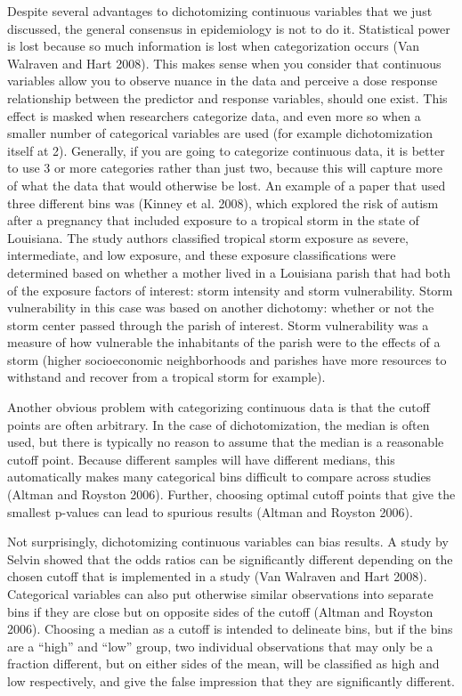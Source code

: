 \documentclass[]{article}
\begin{document}
Despite several advantages to dichotomizing continuous variables that we
just discussed, the general consensus in epidemiology is not to do it.
Statistical power is lost because so much information is lost when
categorization occurs (Van Walraven and Hart 2008). This makes sense
when you consider that continuous variables allow you to observe nuance
in the data and perceive a dose response relationship between the
predictor and response variables, should one exist. This effect is
masked when researchers categorize data, and even more so when a smaller
number of categorical variables are used (for example dichotomization
itself at 2). Generally, if you are going to categorize continuous data,
it is better to use 3 or more categories rather than just two, because
this will capture more of what the data that would otherwise be lost. An
example of a paper that used three different bins was (Kinney et al.
2008), which explored the risk of autism after a pregnancy that included
exposure to a tropical storm in the state of Louisiana. The study
authors classified tropical storm exposure as severe, intermediate, and
low exposure, and these exposure classifications were determined based
on whether a mother lived in a Louisiana parish that had both of the
exposure factors of interest: storm intensity and storm vulnerability.
Storm vulnerability in this case was based on another dichotomy: whether
or not the storm center passed through the parish of interest. Storm
vulnerability was a measure of how vulnerable the inhabitants of the
parish were to the effects of a storm (higher socioeconomic
neighborhoods and parishes have more resources to withstand and recover
from a tropical storm for example).

Another obvious problem with categorizing continuous data is that the
cutoff points are often arbitrary. In the case of dichotomization, the
median is often used, but there is typically no reason to assume that
the median is a reasonable cutoff point. Because different samples will
have different medians, this automatically makes many categorical bins
difficult to compare across studies (Altman and Royston 2006). Further,
choosing optimal cutoff points that give the smallest p-values can lead
to spurious results (Altman and Royston 2006).

Not surprisingly, dichotomizing continuous variables can bias results. A
study by Selvin showed that the odds ratios can be significantly
different depending on the chosen cutoff that is implemented in a study
(Van Walraven and Hart 2008). Categorical variables can also put
otherwise similar observations into separate bins if they are close but
on opposite sides of the cutoff (Altman and Royston 2006). Choosing a
median as a cutoff is intended to delineate bins, but if the bins are a
``high'' and ``low'' group, two individual observations that may only be
a fraction different, but on either sides of the mean, will be
classified as high and low respectively, and give the false impression
that they are significantly different.
\end{document}
